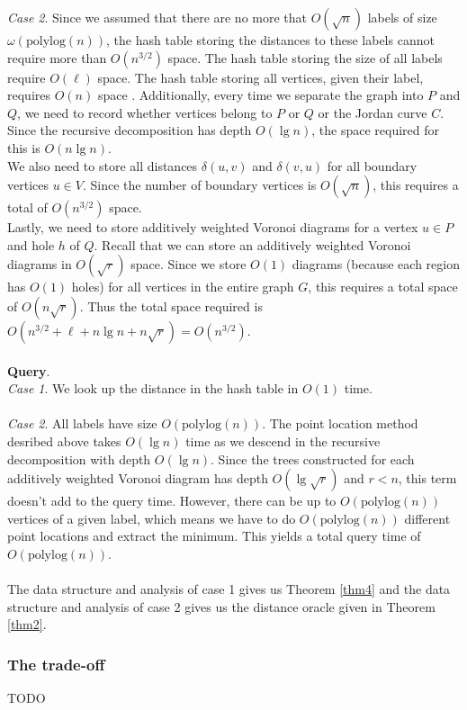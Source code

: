 \textit{Case 2}. Since we assumed that there are no more that
$O(\sqrt{n})$ labels of size $\omega(\text{polylog}(n))$, the hash table storing the
distances to these labels cannot require more than $O(n^{3/2})$ space. The hash table
storing the size of all labels require $O(\ell)$ space. The hash table storing all
vertices, given their label, requires $O(n)$ space \cite{fredman1984storing}. Additionally, every time we
separate the graph into $P$ and $Q$, we need to record whether vertices belong to $P$ or
$Q$ or the Jordan curve $C$. Since the recursive decomposition has depth $O(\lg n)$, the
space required for this is $O(n\lg n)$. \\
We also need to store all distances $\delta(u,v)$ and $\delta(v,u)$ for all
boundary vertices $u\in V$. Since the number of boundary vertices is $O(\sqrt{n})$, this
requires a total of $O(n^{3/2})$ space. \\
Lastly, we need to store additively weighted Voronoi diagrams for a vertex $u\in P$ and
hole $h$ of $Q$. Recall that we can store an additively weighted Voronoi diagrams in
$O(\sqrt{r})$ space. Since we store $O(1)$ diagrams (because each region has $O(1)$ holes) for
all vertices in the entire graph $G$, this requires a total space of $O(n\sqrt{r})$.
Thus the total space required is $O(n^{3/2}+\ell+n\lg n+n\sqrt{r})=O(n^{3/2})$. \\
\\
\textbf{Query}. \\
\textit{Case 1}. We look up the distance in the hash table in $O(1)$ time.\\
\\
\textit{Case 2}. All labels have size $O(\text{polylog}(n))$. The point location method desribed
above takes $O(\lg n)$ time as we descend in the recursive decomposition with depth
$O(\lg n)$. Since the trees constructed for each additively weighted Voronoi diagram has
depth $O(\lg \sqrt{r})$ and $r<n$, this term doesn't add to the query time. However,
there can be up to $O(\text{polylog}(n))$ vertices of a given label, which means we have
to do $O(\text{polylog}(n))$ different point locations and extract the minimum. This
yields a total query time of $O(\text{polylog}(n))$. \\
\\
The data structure and analysis of case 1 gives us Theorem \ref{thm4} and the data structure and analysis of case 2 gives us the distance oracle given in Theorem \ref{thm2}.

\subsubsection{The trade-off}
TODO \\
